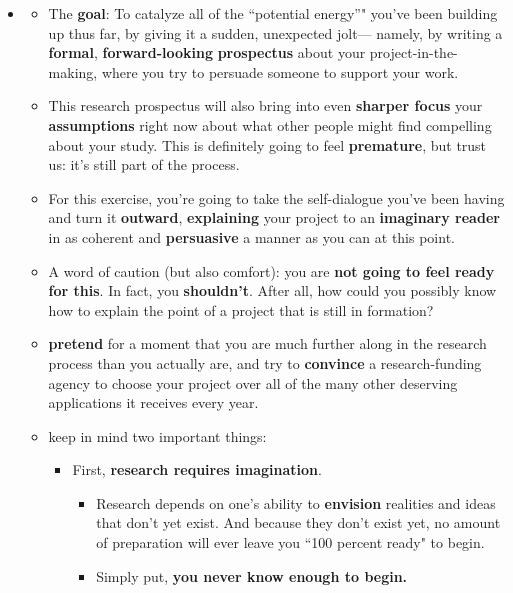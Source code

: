\documentclass[11pt]{article}
\begin{document}
\begin{itemize}
\item \begin{exercise}
\begin{itemize}
\item The \textbf{goal}: To catalyze all of the ``potential energy”" you’ve been building up thus far, by giving it a sudden, unexpected jolt— namely, by writing a \textbf{formal}, \textbf{forward-looking} \textbf{prospectus} about your project-in-the-making, where you try to persuade someone to support your work. 

\item This research prospectus will also bring into even \textbf{sharper focus} your \textbf{assumptions} right now about what other people might find compelling about your study. This is definitely going to feel \textbf{premature}, but trust us: it’s still part of the process.

\item For this exercise, you’re going to take the self-dialogue you’ve been having and turn it \textbf{outward}, \textbf{explaining} your project to an \textbf{imaginary reader} in as coherent and \textbf{persuasive} a manner as you can at this point. 

\item A word of caution (but also comfort): you are \textbf{not going to feel ready for this}. In fact, you \textbf{shouldn’t}. After all,
how could you possibly know how to explain the point of a project that is still in formation? 

\item \textbf{pretend} for a moment that you are much further along in the research process than you actually are, and try to \textbf{convince} a research-funding agency to choose your project over all of the many other deserving applications it receives every year.

\item keep in mind two important things:
\begin{itemize}
\item First, \textbf{research requires imagination}.
\begin{itemize}
\item  Research depends on one’s ability to \textbf{envision} realities and ideas that don’t yet exist. And because they don’t exist yet, no amount of preparation will ever leave you ``100 percent ready" to begin.

\item Simply put, \textbf{you never know enough to begin.}


\end{itemize}
\end{itemize}
\end{itemize}
\end{exercise}
\end{itemize}
\end{document}
